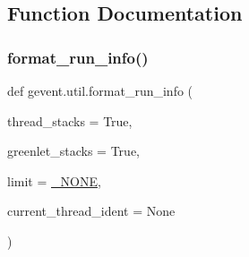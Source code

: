 \subsection{Function Documentation}
\mbox{\label{namespacegevent_1_1util_a090199c0559180f496b56c8352241891}} 
\subsubsection{\texorpdfstring{format\+\_\+run\+\_\+info()}{format\_run\_info()}}
{\footnotesize\ttfamily def gevent.\+util.\+format\+\_\+run\+\_\+info (\begin{DoxyParamCaption}\item[{}]{thread\+\_\+stacks = {\ttfamily True},  }\item[{}]{greenlet\+\_\+stacks = {\ttfamily True},  }\item[{}]{limit = {\ttfamily \hyperlink{classgevent_1_1__util_1_1___n_o_n_e}{\+\_\+\+N\+O\+NE}},  }\item[{}]{current\+\_\+thread\+\_\+ident = {\ttfamily None} }\end{DoxyParamCaption})}

